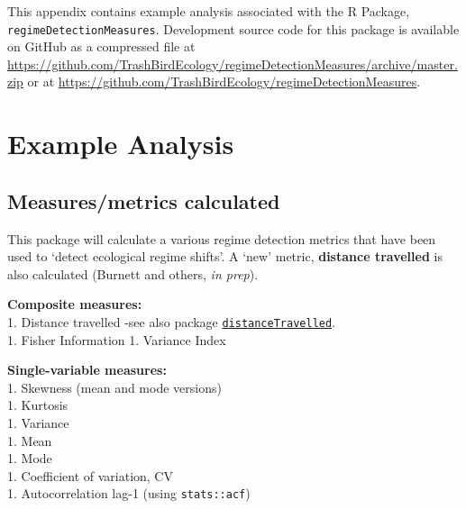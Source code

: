 \documentclass[12pt,twoside,openany]{reedthesis}
\begin{document}
This appendix contains example analysis associated with the R Package, \texttt{regimeDetectionMeasures}. Development source code for this package is available on GitHub as a compressed file at \url{https://github.com/TrashBirdEcology/regimeDetectionMeasures/archive/master.zip} or at \url{https://github.com/TrashBirdEcology/regimeDetectionMeasures}.

\hypertarget{example-analysis}{%
\section{Example Analysis}\label{example-analysis}}

\hypertarget{measuresmetrics-calculated}{%
\subsection{Measures/metrics calculated}\label{measuresmetrics-calculated}}

This package will calculate a various regime detection metrics that have been used to `detect ecological regime shifts'. A `new' metric, \textbf{distance travelled} is also calculated (Burnett and others, \emph{in prep}).

\textbf{Composite measures:}\\
1. Distance travelled -see also package \href{https://github.com/TrashBirdEcology/distanceTravelled}{\texttt{distanceTravelled}}.\\
1. Fisher Information
1. Variance Index

\textbf{Single-variable measures:}\\
1. Skewness (mean and mode versions)\\
1. Kurtosis\\
1. Variance\\
1. Mean\\
1. Mode\\
1. Coefficient of variation, CV\\
1. Autocorrelation lag-1 (using \texttt{stats::acf})
\end{document}
